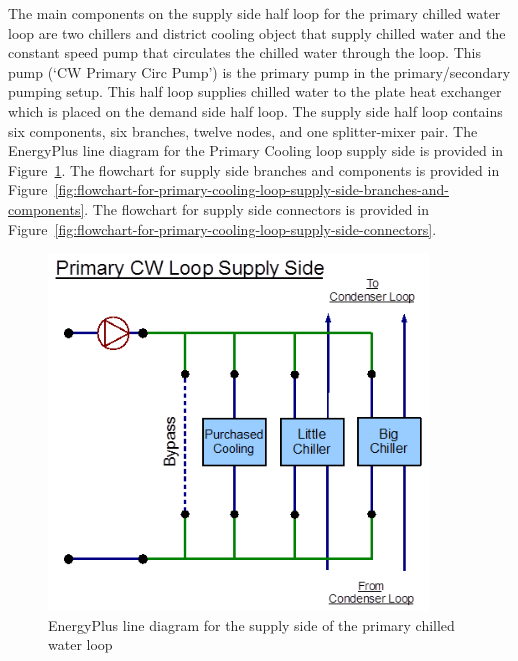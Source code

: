 The main components on the supply side half loop for the primary chilled water loop are two chillers and district cooling object that supply chilled water and the constant speed pump that circulates the chilled water through the loop. This pump (`CW Primary Circ Pump') is the primary pump in the primary/secondary pumping setup. This half loop supplies chilled water to the plate heat exchanger which is placed on the demand side half loop. The supply side half loop contains six components, six branches, twelve nodes, and one splitter-mixer pair. The EnergyPlus line diagram for the Primary Cooling loop supply side is provided in Figure~\ref{fig:energyplus-line-diagram-for-the-supply-side-005}. The flowchart for supply side branches and components is provided in Figure~\ref{fig:flowchart-for-primary-cooling-loop-supply-side-branches-and-components}. The flowchart for supply side connectors is provided in Figure~\ref{fig:flowchart-for-primary-cooling-loop-supply-side-connectors}.

\begin{figure}[hbtp] %
\centering
\includegraphics[width=0.9\textwidth, height=0.9\textheight, keepaspectratio=true]{media/image093.png}
\caption{EnergyPlus line diagram for the supply side of the primary chilled water loop \protect \label{fig:energyplus-line-diagram-for-the-supply-side-005}}
\end{figure}

